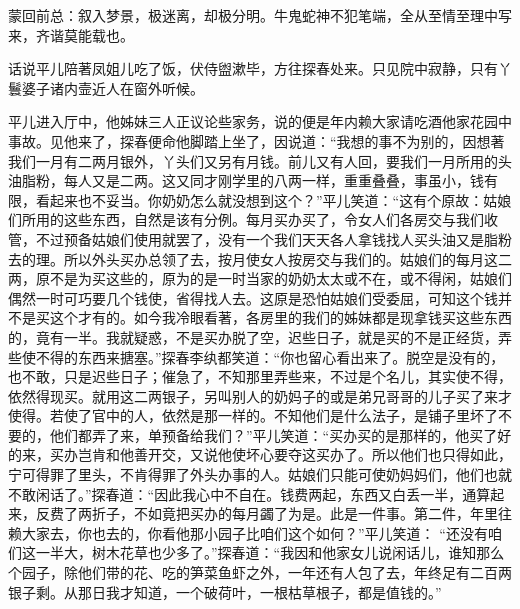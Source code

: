 

\begin{parag}
    \begin{note}蒙回前总：叙入梦景，极迷离，却极分明。牛鬼蛇神不犯笔端，全从至情至理中写来，齐谐莫能载也。\end{note}
\end{parag}


\begin{parag}
    话说平儿陪著凤姐儿吃了饭，伏侍盥漱毕，方往探春处来。只见院中寂静，只有丫鬟婆子诸内壸近人在窗外听候。
\end{parag}


\begin{parag}
    平儿进入厅中，他姊妹三人正议论些家务，说的便是年内赖大家请吃酒他家花园中事故。见他来了，探春便命他脚踏上坐了，因说道：“我想的事不为别的，因想著我们一月有二两月银外，丫头们又另有月钱。前儿又有人回，要我们一月所用的头油脂粉，每人又是二两。这又同才刚学里的八两一样，重重叠叠，事虽小，钱有限，看起来也不妥当。你奶奶怎么就没想到这个？”平儿笑道：“这有个原故：姑娘们所用的这些东西，自然是该有分例。每月买办买了，令女人们各房交与我们收管，不过预备姑娘们使用就罢了，没有一个我们天天各人拿钱找人买头油又是脂粉去的理。所以外头买办总领了去，按月使女人按房交与我们的。姑娘们的每月这二两，原不是为买这些的，原为的是一时当家的奶奶太太或不在，或不得闲，姑娘们偶然一时可巧要几个钱使，省得找人去。这原是恐怕姑娘们受委屈，可知这个钱并不是买这个才有的。如今我冷眼看著，各房里的我们的姊妹都是现拿钱买这些东西的，竟有一半。我就疑惑，不是买办脱了空，迟些日子，就是买的不是正经货，弄些使不得的东西来搪塞。”探春李纨都笑道：“你也留心看出来了。脱空是没有的，也不敢，只是迟些日子；催急了，不知那里弄些来，不过是个名儿，其实使不得，依然得现买。就用这二两银子，另叫别人的奶妈子的或是弟兄哥哥的儿子买了来才使得。若使了官中的人，依然是那一样的。不知他们是什么法子，是铺子里坏了不要的，他们都弄了来，单预备给我们？”平儿笑道：“买办买的是那样的，他买了好的来，买办岂肯和他善开交，又说他使坏心要夺这买办了。所以他们也只得如此，宁可得罪了里头，不肯得罪了外头办事的人。姑娘们只能可使奶妈妈们，他们也就不敢闲话了。”探春道：“因此我心中不自在。钱费两起，东西又白丢一半，通算起来，反费了两折子，不如竟把买办的每月蠲了为是。此是一件事。第二件，年里往赖大家去，你也去的，你看他那小园子比咱们这个如何？”平儿笑道： “还没有咱们这一半大，树木花草也少多了。”探春道：“我因和他家女儿说闲话儿，谁知那么个园子，除他们带的花、吃的笋菜鱼虾之外，一年还有人包了去，年终足有二百两银子剩。从那日我才知道，一个破荷叶，一根枯草根子，都是值钱的。”
\end{parag}


